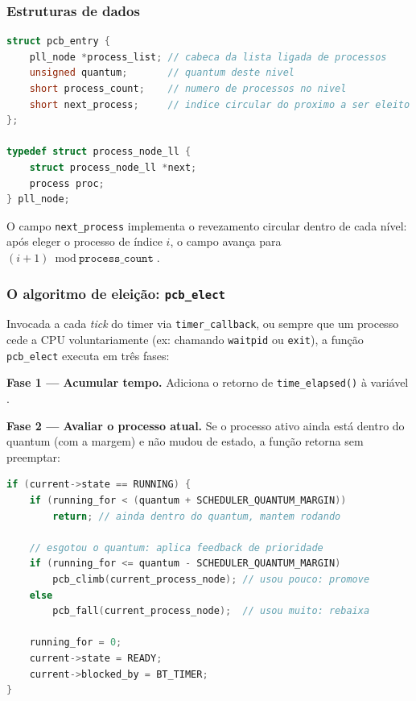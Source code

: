 \subsubsection{Estruturas de dados}

\lstset{captionpos=t}
\begin{lstlisting}[language=C, caption={Estruturas do escalonador em \texttt{scheduler.h}}]
struct pcb_entry {
    pll_node *process_list; // cabeca da lista ligada de processos
    unsigned quantum;       // quantum deste nivel
    short process_count;    // numero de processos no nivel
    short next_process;     // indice circular do proximo a ser eleito
};

typedef struct process_node_ll {
    struct process_node_ll *next;
    process proc;
} pll_node;
\end{lstlisting}
\lstset{captionpos=b}

O campo \texttt{next\_process} implementa o revezamento circular dentro de
cada nível: após eleger o processo de índice $i$, o campo avança para
$(i+1) \bmod \texttt{process\_count}$.

\subsubsection{O algoritmo de eleição: \texttt{pcb\_elect}}

Invocada a cada \emph{tick} do timer via \texttt{timer\_callback}, ou sempre que 
um processo cede a CPU voluntariamente (ex: chamando \texttt{waitpid} ou \texttt{exit}),
a função \texttt{pcb\_elect} executa em três fases:

\textbf{Fase 1 — Acumular tempo.} Adiciona o retorno de \texttt{time\_elapsed()}
à variável .

\textbf{Fase 2 — Avaliar o processo atual.} Se o processo ativo ainda está dentro
do quantum (com a margem) e não mudou de estado, a função retorna sem preemptar:

\lstset{captionpos=t}
\begin{lstlisting}[language=C, caption={Avaliação do quantum em \texttt{pcb\_elect}}]
if (current->state == RUNNING) {
    if (running_for < (quantum + SCHEDULER_QUANTUM_MARGIN))
        return; // ainda dentro do quantum, mantem rodando

    // esgotou o quantum: aplica feedback de prioridade
    if (running_for <= quantum - SCHEDULER_QUANTUM_MARGIN)
        pcb_climb(current_process_node); // usou pouco: promove
    else
        pcb_fall(current_process_node);  // usou muito: rebaixa
        
    running_for = 0;
    current->state = READY;
    current->blocked_by = BT_TIMER;
}
\end{lstlisting}
\lstset{captionpos=b}

